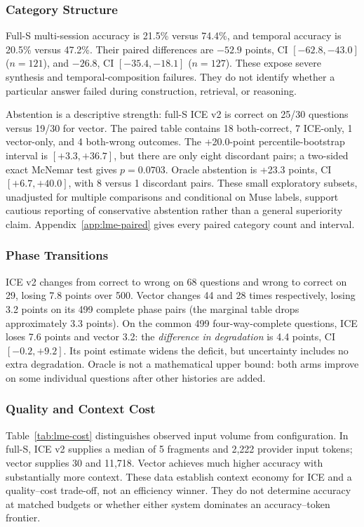 \documentclass[twoside,11pt]{article}
\begin{document}
\subsubsection{Category Structure}
Full-S multi-session accuracy is 21.5\% versus 74.4\%, and temporal accuracy is 20.5\% versus 47.2\%. Their paired differences are $-52.9$ points, CI $[-62.8,-43.0]$ ($n=121$), and $-26.8$, CI $[-35.4,-18.1]$ ($n=127$). These expose severe synthesis and temporal-composition failures. They do not identify whether a particular answer failed during construction, retrieval, or reasoning.

Abstention is a descriptive strength: full-S ICE v2 is correct on 25/30 questions versus 19/30 for vector. The paired table contains 18 both-correct, 7 ICE-only, 1 vector-only, and 4 both-wrong outcomes. The +20.0-point percentile-bootstrap interval is $[+3.3,+36.7]$, but there are only eight discordant pairs; a two-sided exact McNemar test gives $p=0.0703$. Oracle abstention is +23.3 points, CI $[+6.7,+40.0]$, with 8 versus 1 discordant pairs. These small exploratory subsets, unadjusted for multiple comparisons and conditional on Muse labels, support cautious reporting of conservative abstention rather than a general superiority claim. Appendix~\ref{app:lme-paired} gives every paired category count and interval.

\subsubsection{Phase Transitions}
ICE v2 changes from correct to wrong on 68 questions and wrong to correct on 29, losing 7.8 points over 500. Vector changes 44 and 28 times respectively, losing 3.2 points on its 499 complete phase pairs (the marginal table drops approximately 3.3 points). On the common 499 four-way-complete questions, ICE loses 7.6 points and vector 3.2: the \emph{difference in degradation} is 4.4 points, CI $[-0.2,+9.2]$. Its point estimate widens the deficit, but uncertainty includes no extra degradation. Oracle is not a mathematical upper bound: both arms improve on some individual questions after other histories are added.

\subsubsection{Quality and Context Cost}
Table~\ref{tab:lme-cost} distinguishes observed input volume from configuration. In full-S, ICE v2 supplies a median of 5 fragments and 2,222 provider input tokens; vector supplies 30 and 11,718. Vector achieves much higher accuracy with substantially more context. These data establish context economy for ICE and a quality--cost trade-off, not an efficiency winner. They do not determine accuracy at matched budgets or whether either system dominates an accuracy--token frontier.
\end{document}
